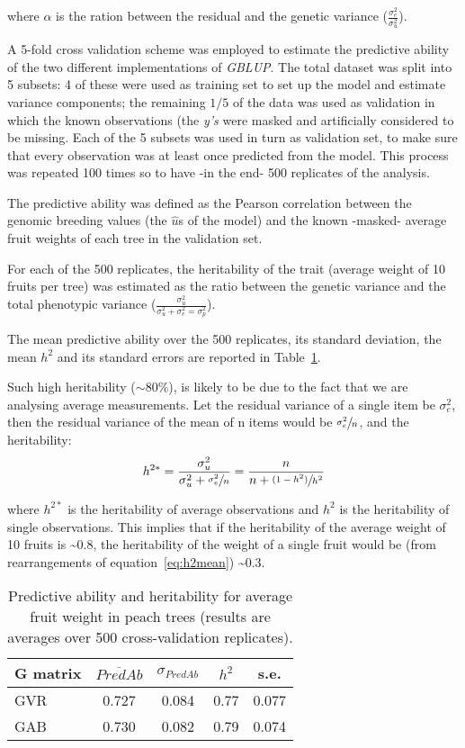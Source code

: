 \documentclass[english,11pt,a4paper]{scrartcl}
\begin{document}
where $\alpha$ is the ration between the residual and the genetic
variance ($\frac{\sigma^2_e}{\sigma^2_u}$).

A 5-fold cross validation scheme was employed to estimate the predictive
ability of the two different implementations of \emph{GBLUP}. The total
dataset was split into 5 subsets: 4 of these were used as training set
to set up the model and estimate variance components; the remaining $1/5$ of the data was
used as validation in which the known observations (the \emph{y's} were
masked and artificially considered to be missing. Each of the 5 subsets
was used in turn as validation set, to make sure that every observation
was at least once predicted from the model.
This process was repeated 100 times so to have -in the end- 500
replicates of the analysis.
 
The predictive ability was defined as the Pearson correlation between
the genomic breeding values (the $\hat{u}$s of
the model) and the known -masked- average fruit weights of each
tree in the validation set.

For each of the 500 replicates, the heritability of the trait (average
weight of 10 fruits per tree) was estimated as the ratio between the
genetic variance and the total phenotypic variance ($\frac{\sigma^2_u}{\sigma^2_u+\sigma^2_e=\sigma^2_p}$).

The mean predictive ability over the 500 replicates, its standard
deviation, the mean $h^2$ and its standard errors are reported in
Table~\ref{tab:CrossValGBLUP}.  

Such high heritability ($\sim 80\%$), is likely to be due to the fact
that we are analysing average measurements. Let the residual variance of
a single item be $\sigma^2_e$, then the residual variance of the mean of
n items would be $\sfrac{\sigma^2_e}{n}$, and the heritability: 
\begin{equation} \label{eq:h2mean}
h^{2*}=\frac{\sigma^2_u}{\sigma^2_u+\sfrac{\sigma^2_e}{n}}=\frac{n}{n+\sfrac{(1-h^2)}{h^2}}
\end{equation}

where $h^{2*}$ is the heritability of average observations and $h^2$ is
the heritability of single observations. This implies that if the
heritability of the average weight of 10 fruits is \textasciitilde 0.8,
the heritability of the weight of a single fruit would be (from
rearrangements of equation~\ref{eq:h2mean})
\textasciitilde 0.3.

\begin{table}
\centering
\begin{tabular}{l c c c c}
G matrix & $\overline{PredAb}$ & $\sigma_{PredAb}$ & $h^2$ & s.e. \\
\hline
GVR & 0.727 & 0.084 & 0.77 & 0.077 \\
GAB & 0.730 & 0.082 & 0.79 & 0.074 \\
\end{tabular}
\caption{Predictive ability and heritability for average fruit weight in
  peach trees (results are averages over 500 cross-validation replicates).}
\label{tab:CrossValGBLUP}
\end{table}
\end{document}
